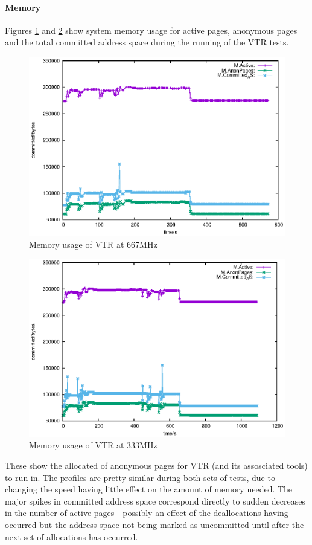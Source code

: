 \documentclass[a4paper]{article}
\begin{document}
  \paragraph{Memory}
    Figures \ref{fig:vtr:mem:667} and \ref{fig:vtr:mem:333} show system memory usage for active pages, anonymous pages and the total committed address space during the running of the VTR tests.
    \begin{figure}[p]
      \includegraphics[width=\textwidth]{data/fig/vtr:mem:667.eps}
      \caption{Memory usage of VTR at 667MHz}
      \label{fig:vtr:mem:667}
    \end{figure}
    \begin{figure}[p]
      \includegraphics[width=\textwidth]{data/fig/vtr:mem:333.eps}
      \caption{Memory usage of VTR at 333MHz}
      \label{fig:vtr:mem:333}
    \end{figure}
    These show the allocated of anonymous pages for VTR (and its assosciated tools) to run in. The profiles are pretty similar during both sets of tests, due to changing the speed having little effect on the amount of memory needed. The major spikes in committed address space correspond directly to sudden decreases in the number of active pages - possibly an effect of the deallocations having occurred but the address space not being marked as uncommitted until after the next set of allocations has occurred.
\end{document}
